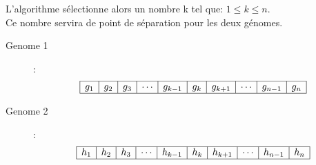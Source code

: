                     L'algorithme sélectionne alors un nombre k tel que: $1\leq k\leq n$.\\
                    Ce nombre servira de point de séparation pour les deux génomes.
                    \begin{description}
                        \item[Genome 1]:\\
                            \[
                                \begin{array}{|c|c|c|c|c|c|c|c|c|c|}
                                    \hline
                                    g_1&g_2&g_3&\cdots&g_{k-1}&g_k&g_{k+1}&\cdots&g_{n-1}&g_{n}\\
                                    \hline
                                \end{array}
                            \]
                        \item[Genome 2]:\\
                            \[
                                \begin{array}{|c|c|c|c|c|c|c|c|c|c|}
                                    \hline
                                    h_1&h_2&h_3&\cdots&h_{k-1}&h_k&h_{k+1}&\cdots&h_{n-1}&h_{n}\\
                                    \hline
                                \end{array}
                            \]
                    \end{description}

